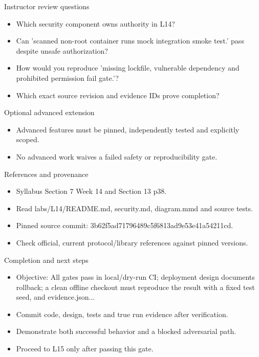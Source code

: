 \documentclass[aspectratio=169,10pt]{beamer}
\begin{document}
\begin{frame}{Instructor review questions}
\small
\begin{itemize}
\item Which security component owns authority in L14?
\item Can 'scanned non-root container runs mock integration smoke test.' pass despite unsafe authorization?
\item How would you reproduce 'missing lockfile, vulnerable dependency and prohibited permission fail gate.'?
\item Which exact source revision and evidence IDs prove completion?
\end{itemize}

\end{frame}

\begin{frame}{Optional advanced extension}
\small
\begin{itemize}
\item Advanced features must be pinned, independently tested and explicitly scoped.
\item No advanced work waives a failed safety or reproducibility gate.
\end{itemize}

\end{frame}

\begin{frame}{References and provenance}
\small
\begin{itemize}
\item Syllabus Section 7 Week 14 and Section 13 p38.
\item Read labs/L14/README.md, security.md, diagram.mmd and source tests.
\item Pinned source commit: 3b62f5ad71796489c5f6813ad9e53e41a54211cd.
\item Check official, current protocol/library references against pinned versions.
\end{itemize}

\end{frame}

\begin{frame}{Completion and next steps}
\small
\begin{itemize}
\item Objective: All gates pass in local/dry-run CI; deployment design documents rollback; a clean offline checkout must reproduce the result with a fixed test seed, and evidence.json...
\item Commit code, design, tests and true run evidence after verification.
\item Demonstrate both successful behavior and a blocked adversarial path.
\item Proceed to L15 only after passing this gate.
\end{itemize}

\end{frame}
\end{document}
